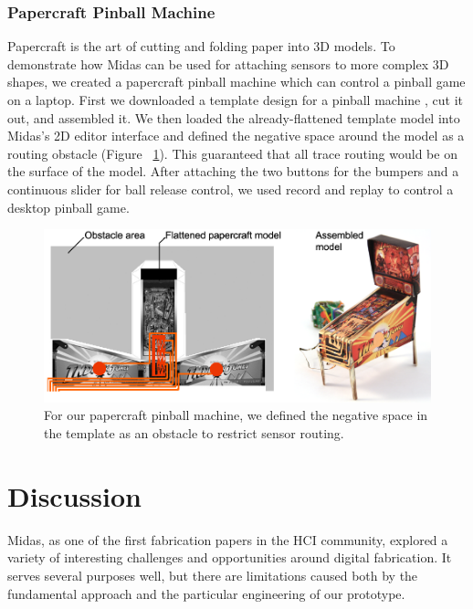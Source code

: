        \subsubsection{Papercraft Pinball Machine}
Papercraft is the art of cutting and folding paper into 3D models. To demonstrate how Midas can be used for attaching sensors to more complex 3D shapes, 
we created a papercraft pinball machine which can control a pinball game on a laptop. First we downloaded a template design for a pinball machine \cite{indianajones}, cut it out, and assembled it. We then loaded the already-flattened template model into Midas's 2D editor interface and defined the negative space around the model as a routing obstacle (Figure ~\ref{fig:midas-pinball}). This guaranteed that all trace routing would be on the surface of the model. After attaching the two buttons for the bumpers and a continuous slider for ball release control, we used record and replay to control a desktop pinball game.

\begin{figure}
\centering
\includegraphics[width=\textwidth]{figures/midas/pinball-horizontal.png}
\caption{For our papercraft pinball machine, we defined the negative space in the template as an obstacle to restrict sensor routing.} 
\label{fig:midas-pinball}
\end{figure}


\section{Discussion}

    Midas, as one of the first fabrication papers in the HCI community, explored a variety of interesting challenges and opportunities around digital fabrication. It serves several purposes well, but there are limitations caused both by the fundamental approach and the particular engineering of our prototype.

